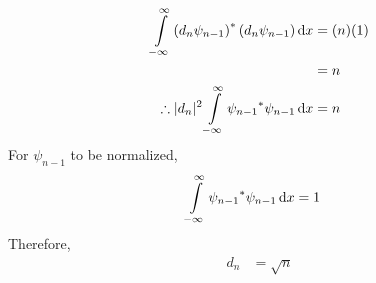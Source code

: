\documentclass[fleqn, a4paper, 11pt, oneside]{amsart}
\theoremstyle{definition}
\theoremstyle{theorem}
\begin{document}
\begin{solution}
\begin{enumerate}[leftmargin=*]
			\begin{align*}
				\int\limits_{-\infty}^{\infty} \left( d_n \psi_{n - 1} \right)^* \left( d_n \psi_{n - 1} \right) \dif x & = (n) (1) \\
                                                                                                                                        & = n       \\
				\therefore |d_n|^2 \int\limits_{-\infty}^{\infty} {\psi_{n - 1}}^* \psi_{n - 1} \dif x                  & = n
			\end{align*}
			For $\psi_{n - 1}$ to be normalized,
			\begin{align*}
				\int\limits_{-\infty}^{\infty} {\psi_{n - 1}}^* \psi_{n - 1} \dif x & = 1
			\end{align*}
			Therefore,
			\begin{align*}
				d_n & = \sqrt{n}
			\end{align*}
	\end{enumerate}
\end{solution}
\end{document}
